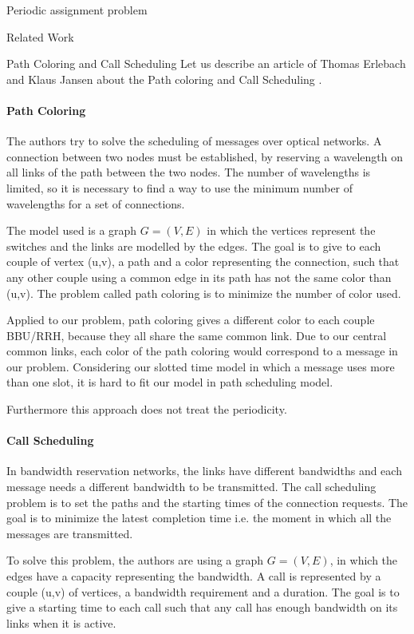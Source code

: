 \documentclass[a4paper,10pt]{report}
\begin{document}
\begin{chapter}{Periodic assignment problem}
\begin{section}{Related Work}
\begin{enumerate}
\end{enumerate}

\begin{subsection}{Path Coloring and Call Scheduling}
Let us describe an article of Thomas Erlebach and Klaus Jansen about the Path coloring and Call Scheduling \cite{erlebach2001complexity}.

\paragraph{Path Coloring}
The authors try to solve the scheduling of messages over optical networks. A connection between two nodes must be established, by reserving a wavelength on all links of the
path between the two nodes. The number of wavelengths is limited, so it is necessary to find a way to use the minimum number of wavelengths for a set 
of connections.

The model used is a graph $G=(V,E)$ in which the vertices represent the switches and the links are modelled by the edges. The goal is to give to each
couple of vertex (u,v), a path and a color representing the connection, such that any other couple using a common edge in its path has not the same
color than (u,v). The problem called path coloring is to minimize the number of color used.

Applied to our problem, path coloring gives a different color to each couple BBU/RRH, because they all share the same common link.
Due to our central common links, each color of the path coloring
would correspond to a message in our problem. Considering our slotted time model in which a message uses more than one slot,
it is hard to fit our model in path scheduling model.

Furthermore this approach does not treat the periodicity. 

\paragraph{Call Scheduling}
In bandwidth reservation networks, the links have different bandwidths and each message 
needs a different bandwidth to be transmitted. The call scheduling problem is to set the paths and the starting times of the connection requests.
The goal is to minimize the latest completion time i.e. the moment in which all the messages are transmitted.

To solve this problem, the authors are using a graph $G=(V,E)$, in which the edges have a capacity representing the bandwidth.
A call is represented by a couple (u,v) of vertices, a bandwidth requirement and a duration. The goal is to give a starting time to each call
such that any call has enough bandwidth on its links when it is active.


\end{subsection}
\end{section}
\end{chapter}
\end{document}
